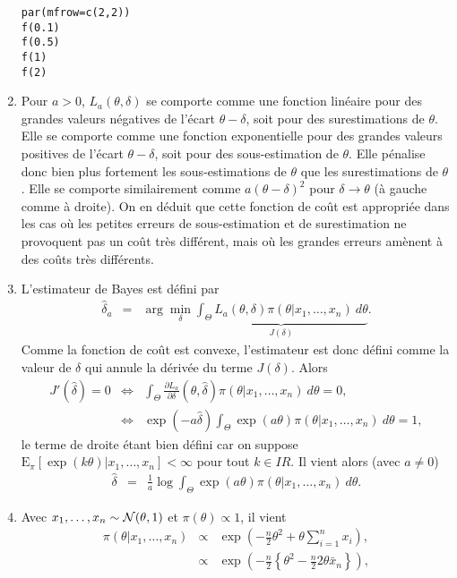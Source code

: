 \documentclass[10pt]{article}
\newcommand{\R}{I\!\!R}
\newcommand{\E}{\mbox{E}}
\newcommand{\1}{\mathbbm{1}}
\begin{document}
\begin{enumerate}
\begin{verbatim}
par(mfrow=c(2,2))
f(0.1)
f(0.5)
f(1)
f(2)
\end{verbatim} 
\item Pour $a>0$, $L_a(\theta,\delta)$ se comporte comme une fonction linéaire pour des grandes valeurs négatives de l'écart $\theta-\delta$, soit pour des surestimations de $\theta$. Elle se comporte comme une fonction exponentielle pour des grandes valeurs positives de l'écart $\theta-\delta$, soit pour des sous-estimation de $\theta$. Elle pénalise donc bien plus fortement les sous-estimations de $\theta$ que les surestimations de $\theta$. Elle se comporte similairement comme $a(\theta-\delta)^2$ pour $\delta\to\theta$ (à gauche comme à droite). On en déduit que cette fonction de coût est appropriée dans les cas où les petites erreurs de sous-estimation et de surestimation ne provoquent pas un coût très différent, mais où les grandes erreurs amènent à des coûts très différents. 
\item L'estimateur de Bayes est défini par
\begin{eqnarray*}
\hat{\delta}_a & = & \arg\min\limits_{\delta} \underbrace{\int_{\Theta} L_a(\theta,\delta) \pi(\theta|x_1,\ldots,x_n) \ d\theta}_{J(\delta)}.
\end{eqnarray*}
Comme la fonction de coût est convexe, l'estimateur est donc défini comme la valeur de $\delta$ qui annule la dérivée du terme $J(\delta)$. Alors
\begin{eqnarray*}
J'(\hat{\delta}) = 0 & \Leftrightarrow & \int_{\Theta} \frac{\partial L_a}{\partial \delta}(\theta,\hat{\delta}) \pi(\theta|x_1,\ldots,x_n) \ d\theta = 0, \\
& \Leftrightarrow & \exp(-a\hat{\delta}) \int_{\Theta} \exp(a\theta) \pi(\theta|x_1,\ldots,x_n) \ d\theta = 1,
\end{eqnarray*}
le terme de droite étant bien défini car on suppose $\E_{\pi}[\exp(k\theta)|x_1,\ldots,x_n]<\infty$ pour tout $k\in\R$. Il vient alors (avec $a\neq 0$) 
\begin{eqnarray}
\hat{\delta} & = & \frac{1}{a}\log  \int_{\Theta} \exp(a\theta) \pi(\theta|x_1,\ldots,x_n) \ d\theta. \label{estimateur}
\end{eqnarray}
\item Avec $x_1,\ldots,x_n\sim{\cal{N}}(\theta,1)$ et $\pi(\theta)\propto 1$, il vient
\begin{eqnarray*}
\pi(\theta|x_1,\ldots,x_n) & \propto & \exp\left(- \frac{n}{2}\theta^2 + \theta \sum\limits_{i=1}^n x_i \right), \\
 & \propto & \exp\left(- \frac{n}{2}\left\{\theta^2 - \frac{n}{2} 2\theta \bar{x}_n\right\} \right), \\

\end{eqnarray*}
\end{enumerate}
\end{document}
